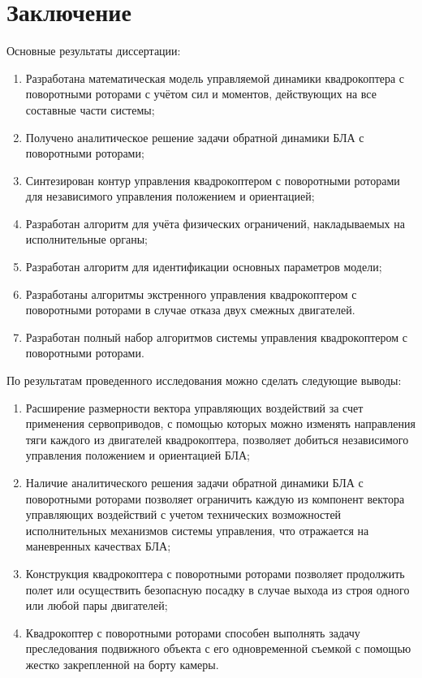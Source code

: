 \chapter{Заключение}
Основные результаты диссертации:
\begin{enumerate}
	\item Разработана математическая модель управляемой динамики квадрокоптера с поворотными роторами с учётом сил и моментов, действующих на все составные части системы;
	\item  Получено аналитическое решение задачи обратной динамики БЛА с поворотными роторами;
	\item Синтезирован контур управления квадрокоптером с поворотными роторами для независимого управления положением и ориентацией; 
	\item Разработан алгоритм для учёта физических ограничений, накладываемых на исполнительные органы;
	\item Разработан алгоритм для идентификации основных параметров модели;
	\item Разработаны алгоритмы экстренного управления квадрокоптером с поворотными роторами в случае отказа двух смежных двигателей.
	\item Разработан полный набор алгоритмов системы управления квадрокоптером с поворотными роторами.
\end{enumerate}
По результатам проведенного исследования можно сделать следующие
выводы:
\begin{enumerate}
	\item Расширение размерности вектора управляющих воздействий за счет применения сервоприводов, с помощью которых можно изменять направления тяги каждого из двигателей квадрокоптера, позволяет добиться независимого управления положением и ориентацией БЛА;
	\item Наличие аналитического решения задачи обратной динамики БЛА с поворотными роторами  позволяет ограничить каждую из компонент вектора управляющих воздействий с учетом технических возможностей исполнительных механизмов системы управления, что отражается на маневренных качествах БЛА;
	\item Конструкция квадрокоптера с поворотными роторами позволяет продолжить полет или осуществить безопасную посадку в случае выхода из строя одного или любой пары двигателей;
	\item Квадрокоптер с поворотными роторами способен выполнять задачу преследования подвижного объекта с его одновременной съемкой с помощью жестко закрепленной на борту камеры.
\end{enumerate}